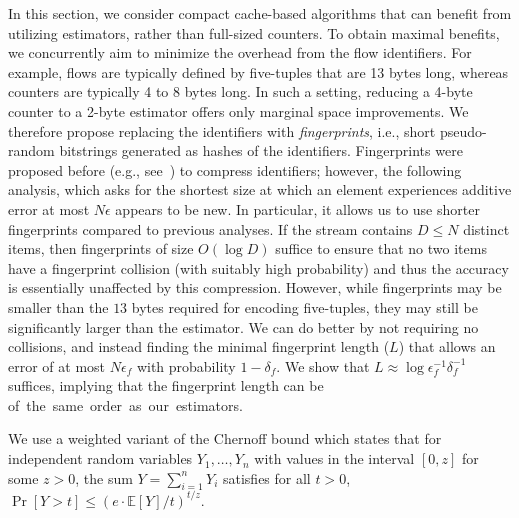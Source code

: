 In this section, we consider compact cache-based algorithms that can benefit from utilizing estimators, rather than full-sized counters. To obtain maximal benefits, we concurrently aim to minimize the overhead from the flow identifiers. For example, flows are typically defined by five-tuples that are 13 bytes long, whereas counters are typically 4 to 8 bytes long.  In such a setting, reducing a 4-byte counter to a 2-byte estimator offers only marginal space improvements.
We therefore propose replacing the identifiers with \emph{fingerprints}, i.e., short pseudo-random bitstrings generated as hashes of the identifiers. 
Fingerprints were proposed before (e.g., see~\cite{HeavyHitters}) to compress identifiers; however, the following analysis, which asks for the shortest size at which an element experiences additive error at most $N\epsilon$ appears to be new. 
In particular, it allows us to use shorter fingerprints compared to previous analyses.
If the stream contains $D\le N$ distinct items, then fingerprints of size $O(\log D)$ suffice to ensure that no two items have a fingerprint collision (with suitably high probability) and thus the accuracy is essentially unaffected by this compression. However, while fingerprints may be smaller than the $13$ bytes required for encoding five-tuples, they may still be significantly larger than the estimator.
We can do better by not requiring no collisions, and instead finding the minimal fingerprint length ($L$) that allows an error of at most $N\epsilon_f$ with probability $1-\delta_f$.  We show that $L\approx \log\epsilon_f^{-1}\delta_f^{-1}$ suffices, implying that the fingerprint length can be \mbox{of the same order as our estimators.}

We use a weighted variant of the Chernoff bound which states 
that for independent random variables $Y_1,\ldots,Y_n$ with values in the interval $[0,z]$ for some $z>0$, the sum $Y=\sum_{i=1}^n Y_i$ satisfies for all $t>0$, 
$
\Pr[Y > t]\le (e\cdot \mathbb E[Y]/t)^{t/z}.
$


